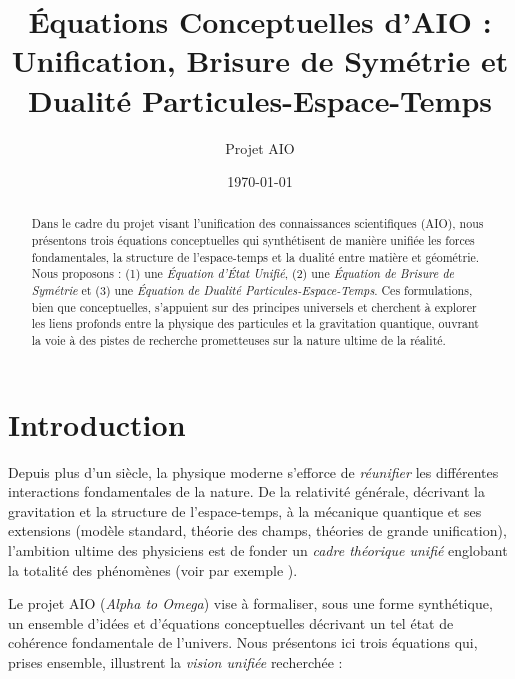 \documentclass[12pt]{article}
\begin{document}
\title{\textbf{Équations Conceptuelles d'AIO : Unification, Brisure de Symétrie et Dualité Particules-Espace-Temps}}
\author{Projet AIO}
\date{\today}
\maketitle

\begin{abstract}
Dans le cadre du projet visant l'unification des connaissances scientifiques (AIO), 
nous présentons trois équations conceptuelles qui synthétisent de manière unifiée 
les forces fondamentales, la structure de l'espace-temps et la dualité 
entre matière et géométrie. Nous proposons : (1) une \emph{Équation d'État Unifié}, 
(2) une \emph{Équation de Brisure de Symétrie} et (3) une \emph{Équation de Dualité Particules-Espace-Temps}. 
Ces formulations, bien que conceptuelles, s'appuient sur des principes universels 
et cherchent à explorer les liens profonds entre la physique des particules 
et la gravitation quantique, ouvrant la voie à des pistes de recherche 
prometteuses sur la nature ultime de la réalité.
\end{abstract}

\tableofcontents

\section{Introduction}

Depuis plus d'un siècle, la physique moderne s'efforce de \emph{réunifier} les différentes 
interactions fondamentales de la nature. De la relativité générale, décrivant la gravitation 
et la structure de l'espace-temps, à la mécanique quantique et ses extensions (modèle standard, 
théorie des champs, théories de grande unification), l'ambition ultime des physiciens est de 
fonder un \emph{cadre théorique unifié} englobant la totalité des phénomènes 
(voir par exemple \cite{weinberg1995quantum, zee2010quantum}).

Le projet AIO (\textit{Alpha to Omega}) vise à formaliser, sous une forme synthétique, 
un ensemble d'idées et d'équations conceptuelles décrivant un tel état de cohérence fondamentale 
de l'univers. Nous présentons ici trois équations qui, prises ensemble, illustrent la 
\emph{vision unifiée} recherchée :
\end{document}
